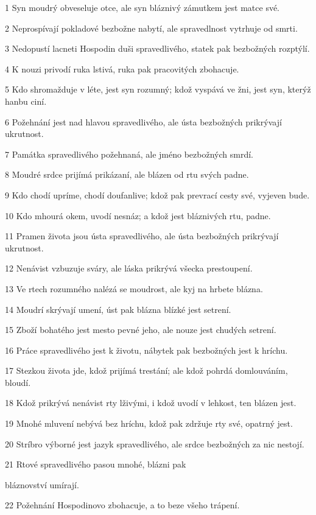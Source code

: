 \par 1 Syn moudrý obveseluje otce, ale syn bláznivý zámutkem jest matce své.
\par 2 Neprospívají pokladové bezbožne nabytí, ale spravedlnost vytrhuje od smrti.
\par 3 Nedopustí lacneti Hospodin duši spravedlivého, statek pak bezbožných rozptýlí.
\par 4 K nouzi privodí ruka lstivá, ruka pak pracovitých zbohacuje.
\par 5 Kdo shromažduje v léte, jest syn rozumný; kdož vyspává ve žni, jest syn, kterýž hanbu ciní.
\par 6 Požehnání jest nad hlavou spravedlivého, ale ústa bezbožných prikrývají ukrutnost.
\par 7 Památka spravedlivého požehnaná, ale jméno bezbožných smrdí.
\par 8 Moudré srdce prijímá prikázaní, ale blázen od rtu svých padne.
\par 9 Kdo chodí upríme, chodí doufanlive; kdož pak prevrací cesty své, vyjeven bude.
\par 10 Kdo mhourá okem, uvodí nesnáz; a kdož jest bláznivých rtu, padne.
\par 11 Pramen života jsou ústa spravedlivého, ale ústa bezbožných prikrývají ukrutnost.
\par 12 Nenávist vzbuzuje sváry, ale láska prikrývá všecka prestoupení.
\par 13 Ve rtech rozumného nalézá se moudrost, ale kyj na hrbete blázna.
\par 14 Moudrí skrývají umení, úst pak blázna blízké jest setrení.
\par 15 Zboží bohatého jest mesto pevné jeho, ale nouze jest chudých setrení.
\par 16 Práce spravedlivého jest k životu, nábytek pak bezbožných jest k hríchu.
\par 17 Stezkou života jde, kdož prijímá trestání; ale kdož pohrdá domlouváním, bloudí.
\par 18 Kdož prikrývá nenávist rty lživými, i kdož uvodí v lehkost, ten blázen jest.
\par 19 Mnohé mluvení nebývá bez hríchu, kdož pak zdržuje rty své, opatrný jest.
\par 20 Stríbro výborné jest jazyk spravedlivého, ale srdce bezbožných za nic nestojí.
\par 21 Rtové spravedlivého pasou mnohé, blázni pak \par bláznovství umírají.
\par 22 Požehnání Hospodinovo zbohacuje, a to beze všeho trápení.

